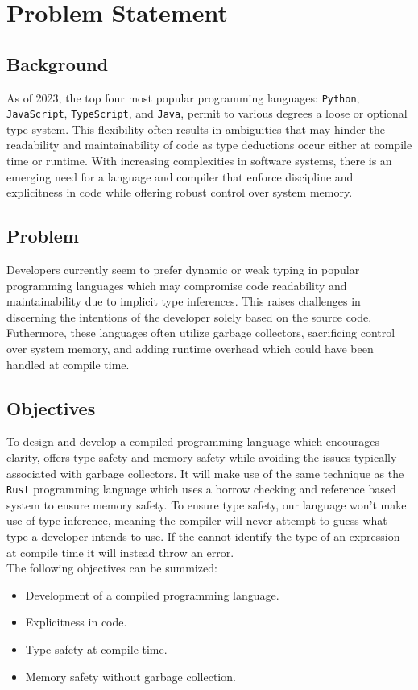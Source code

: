 \section{Problem Statement}
\label{sec:ProblemStatement}

\subsection{Background}

As of 2023, the top four most popular programming languages: \texttt{Python},
\texttt{JavaScript},
\texttt{TypeScript}, and \texttt{Java}, permit to various degrees a loose or optional type
system\cite{STACK}. This flexibility often results in ambiguities that may hinder the
readability and maintainability of code as type deductions occur either at compile
time or runtime. With increasing complexities in software systems, there is an
emerging need for a language and compiler that enforce discipline and explicitness in
code while offering robust control over system memory.

\subsection{Problem}

Developers currently seem to prefer dynamic or weak typing in popular programming
languages\cite{STACK} which may compromise code readability and maintainability due to implicit
type inferences. This raises challenges in discerning the intentions of the developer
solely based on the source code. Futhermore, these languages often utilize garbage
collectors, sacrificing control over system memory, and adding runtime overhead which
could have been handled at compile time.

\subsection{Objectives}
\label{sec:Objectives}

To design and develop a compiled programming language which encourages clarity, offers
type safety and memory safety while avoiding the issues typically associated with
garbage collectors. It will make use of the same technique as the \texttt{Rust} programming
language which uses a borrow checking and reference based system to ensure memory
safety\cite{RUST}. To ensure type safety, our language won't make use of type
inference, meaning the compiler will never attempt to guess what type a developer
intends to use. If the \typeChecker{} cannot identify the type of an expression at
compile time it will instead throw an error. \\

The following objectives can be summized:

\begin{itemize}
  \item Development of a compiled programming language.
  \item Explicitness in code.
  \item Type safety at compile time.
  \item Memory safety without garbage collection.
\end{itemize}
